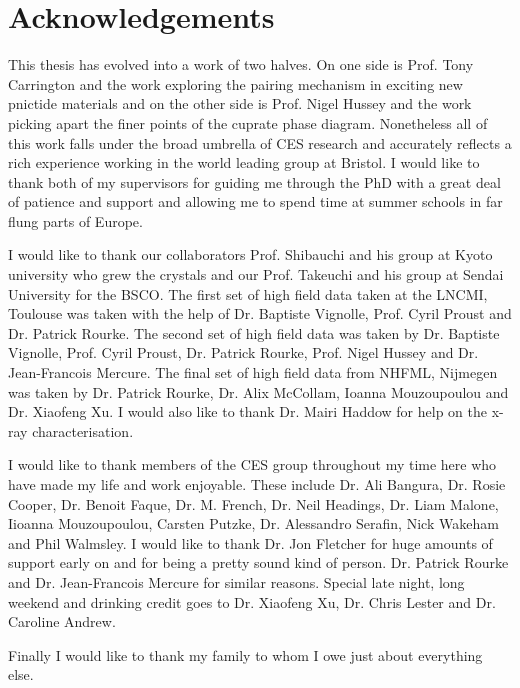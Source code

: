 \cleardoublepage

\section*{Acknowledgements}

This thesis has evolved into a work of two halves. On one side is Prof. Tony Carrington and the work exploring the pairing mechanism in exciting new pnictide materials and on the other side is Prof. Nigel Hussey and the work picking apart the finer points of the cuprate phase diagram. Nonetheless all of this work falls under the broad umbrella of CES research and accurately reflects a rich experience working in the world leading group at Bristol. I would like to thank both of my supervisors for guiding me through the PhD with a great deal of patience and support and allowing me to spend time at summer schools in far flung parts of Europe.

I would like to thank our collaborators Prof. Shibauchi and his group at Kyoto university who grew the \BaFePAs crystals and our Prof. Takeuchi and his group at Sendai University for the \acs{BSCO}. The first set of high field data taken at the \ac{LNCMI}, Toulouse was taken with the help of Dr. Baptiste Vignolle, Prof. Cyril Proust and Dr. Patrick Rourke. The second set of high field data was taken by Dr. Baptiste Vignolle, Prof. Cyril Proust, Dr. Patrick Rourke, Prof. Nigel Hussey and Dr. Jean-Francois Mercure. The final set of high field data from \ac{NHFML}, Nijmegen was taken by Dr. Patrick Rourke, Dr. Alix McCollam, Ioanna Mouzoupoulou and Dr. Xiaofeng Xu. I would also like to thank Dr. Mairi Haddow for help on the x-ray characterisation.

I would like to thank members of the CES group throughout my time here who have made my life and work enjoyable. These include Dr. Ali Bangura, Dr. Rosie Cooper, Dr. Benoit Faque, Dr. M. French, Dr. Neil Headings, Dr. Liam Malone, Iioanna Mouzoupoulou, Carsten Putzke, Dr. Alessandro Serafin, Nick Wakeham and Phil Walmsley. I would like to thank Dr. Jon Fletcher for huge amounts of support early on and for being a pretty sound kind of person. Dr. Patrick Rourke and Dr. Jean-Francois Mercure for similar reasons. Special late night, long weekend and drinking credit goes to Dr. Xiaofeng Xu, Dr. Chris Lester and Dr. Caroline Andrew.

Finally I would like to thank my family to whom I owe just about everything else.


